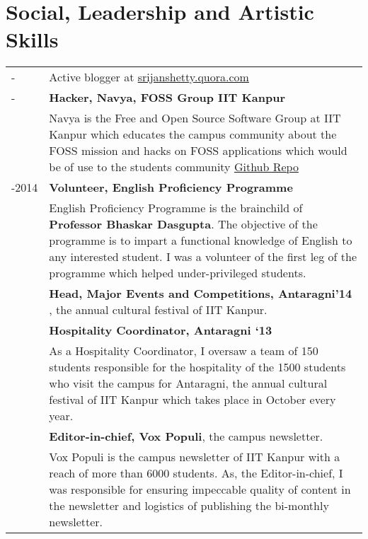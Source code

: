 \documentclass[a4paper,10pt]{article} %
\begin{document}

\section {Social, Leadership and Artistic Skills}

\begin{tabular}{>{\raggedleft}p{2.2cm}p{14cm}}

    -   & Active blogger at \href{srijanshetty.quora.com} {srijanshetty.quora.com} \\

    -    & \textbf{Hacker, Navya, FOSS Group IIT Kanpur}\\
         & \footnotesize{Navya is the Free and Open Source Software Group at IIT
           Kanpur which educates the campus community about the FOSS mission and
           hacks on FOSS applications which would be of use to the students
           community \href{https://github.com/navya} {Github Repo}} \\

    2013-2014    & \textbf{Volunteer, English Proficiency Programme}\\
                 & \footnotesize{English Proficiency Programme is the brainchild
                    of \textbf{Professor Bhaskar Dasgupta}. The objective of the
                    programme is to impart a functional knowledge of English to
                    any interested student. I was a volunteer of the first leg
                    of the programme which helped under-privileged students.}\\

    2014 & \textbf{Head, Major Events and Competitions, Antaragni'14} , the annual cultural festival of
    IIT Kanpur. \\

    2013 & \textbf{Hospitality Coordinator, Antaragni ‘13}\\
         & \footnotesize{As a Hospitality Coordinator, I oversaw a team of 150 students responsible for
            the hospitality of the 1500 students who visit the campus for Antaragni, the annual cultural festival
            of IIT Kanpur which takes place in October every year.}\\

    2013 & \textbf{Editor-in-chief, Vox Populi}, the campus newsletter. \\
         & \footnotesize{Vox Populi is the campus newsletter of IIT Kanpur with a reach of more than 6000 students.
            As, the Editor-in-chief, I was responsible for ensuring impeccable quality of content in the newsletter and
            logistics of publishing the bi-monthly newsletter.}\\


\end{tabular}
\end{document}
